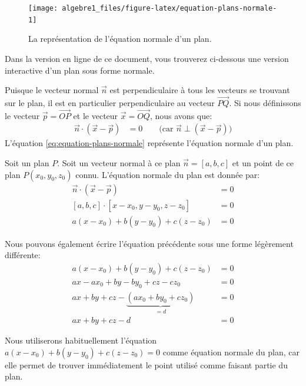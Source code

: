 \documentclass[]{book}
\theoremstyle{definition}
\theoremstyle{definition}
\theoremstyle{definition}
\theoremstyle{remark}
\let\BeginKnitrBlock\begin \let\EndKnitrBlock\end
\begin{document}
\begin{figure}

{\centering \texttt{[image: algebre1\_files/figure-latex/equation-plans-normale-1]} 

}

\caption{La représentation de l'équation normale d'un plan.}\label{fig:equation-plans-normale}
\end{figure}

Dans la version en ligne de ce document, vous trouverez ci-dessous une version interactive d'un plan sous forme normale.

Puisque le vecteur normal \(\vec n\) est perpendiculaire à tous les vecteurs se trouvant sur le plan, il est en particulier perpendiculaire au vecteur \(\overrightarrow{PQ}\). Si nous définissons le vecteur \(\vec p = \overrightarrow{OP}\) et le vecteur \(\vec x=\overrightarrow{OQ}\), nous avons que:
\begin{align}
\vec n \cdot (\vec x - \vec p) &= 0 \qquad\text{(car $\vec n \perp (\vec x - \vec p)$)}
\label{eq:equation-plans-normale}
\end{align}
L'équation \eqref{eq:equation-plans-normale} représente l'équation normale d'un plan.

\BeginKnitrBlock{definition}[L'équation normale d'un plan]
\protect\hypertarget{def:unnamed-chunk-220}{}{\label{def:unnamed-chunk-220} {} }Soit un plan \(P\). Soit un vecteur normal à ce plan \(\vec n=[a,b,c]\) et un point de ce plan \(P(x_0,y_0,z_0)\) connu. L'équation normale du plan est donnée par:
\begin{align*}
\vec n \cdot (\vec x - \vec p) &= 0 \\
[a,b,c] \cdot [x-x_0,y-y_0,z-z_0] &= 0 \\
a(x-x_0)+b(y-y_0)+c(z-z_0) &= 0
\end{align*}

Nous pouvons également écrire l'équation précédente sous une forme légèrement différente:
\begin{align*}
a(x-x_0)+b(y-y_0)+c(z-z_0) &= 0 \\
ax-ax_0+by-by_0+cz-cz_0 &= 0 \\
ax+by+cz-\underbrace{(ax_0+by_0+cz_0)}_{=d} &= 0 \\
ax+by+cz-d &= 0
\end{align*}
\EndKnitrBlock{definition}

\BeginKnitrBlock{remark}
{}Nous utiliserons habituellement l'équation \(a(x-x_0)+b(y-y_0)+c(z-z_0) = 0\) comme équation normale du plan, car elle permet de trouver immédiatement le point utilisé comme faisant partie du plan.
\EndKnitrBlock{remark}
\end{document}

